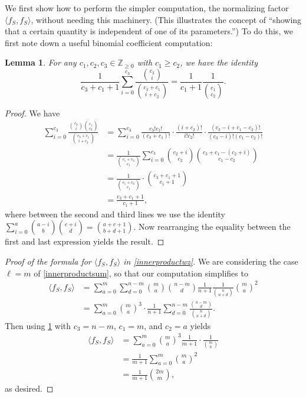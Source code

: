 \documentclass[11pt]{article}
\newcommand{\ZZ}{\mathbb{Z}}
\newcounter{r}
\newcounter{s}
\numberwithin{equation}{section}
\newtheorem{lemma}[theorem]{Lemma}
\begin{document}
We first show how to perform the simpler computation, the normalizing factor $\langle f_S, f_S \rangle$, without needing this machinery. (This illustrates the concept of ``showing that a certain quantity is independent of one of its parameters.'') To do this, we first note down a useful binomial coefficient computation: 

\begin{lemma}\label{binomcoeffcalculation}
For any $c_1, c_2, c_3 \in \ZZ_{\ge 0}$ with $c_1 \ge c_2$, we have the identity
\[
    \frac{1}{c_3+c_1+1}\sum_{i=0}^{c_3} \frac{\binom{c_3}{i}}{\binom{c_3+c_1}{i+c_2}} = \frac{1}{c_1+1} \frac{1}{ \binom{c_1}{c_2}} .
\]
\end{lemma}
\begin{proof}
We have
\begin{align*}
    \sum_{i=0}^{c_3} \frac{\binom{c_3}{i} \binom{c_1}{c_2}}{\binom{c_3+c_1}{i+c_2}} &= \sum_{i=0}^{c_3} \frac{c_3!c_1!}{(c_3+c_1)!} \cdot \frac{(i+c_2)!}{i! c_2!} \cdot \frac{(c_3-i+c_1-c_2)!}{(c_3-i)!(c_1-c_2)!} \\
    &= \frac{1}{\binom{c_1+c_3}{c_1}} \sum_{i=0}^{c_3} \binom{c_2+i}{c_2} \binom{c_3 + c_1 - (c_2+i)}{c_1 - c_2} \\
    &= \frac{1}{\binom{c_1+c_3}{c_1}} \cdot \binom{c_3+c_1+1}{c_1+1} \\
    &= \frac{c_3 + c_1 + 1}{c_1+1},
\end{align*}
where between the second and third lines we use the identity $\sum_{i=0}^a \binom{a-i}{b} \binom{c+i}{d} = \binom{a+c+1}{b+d+1}$. Now rearranging the equality between the first and last expression yields the result.
\end{proof}

\begin{proof}[Proof of the formula for $\langle f_S, f_S \rangle$ in \cref{innerproductwz}]
We are considering the case $\ell = m$ of \cref{innerproductsum}, so that our computation simplifies to
\begin{align*}
    \langle f_S, f_S \rangle &= \sum_{a=0}^m \sum_{d=0}^{n-m} \binom{m}{a} \binom{n-m}{d} \frac{1}{n+1} \frac{1}{\binom{n}{a+d}} \binom{m}{a}^2 \\
    &= \sum_{a=0}^m \binom{m}{a}^3 \cdot \frac{1}{n+1}\sum_{d=0}^{n-m}  \frac{\binom{n-m}{d}}{\binom{n}{a+d}}.
\end{align*}
Then using \cref{binomcoeffcalculation} with $c_3 = n-m$, $c_1 = m$, and $c_2 = a$ yields
\begin{align*}
    \langle f_S, f_S \rangle &= \sum_{a=0}^m \binom{m}{a}^3 \frac{1}{m+1} \cdot \frac{1}{\binom{m}{a}} \\
    &= \frac{1}{m+1}\sum_{a=0}^m \binom{m}{a}^2 \\
    &= \frac{1}{m+1} \binom{2m}{m},
\end{align*}
as desired.
\end{proof}
\end{document}
